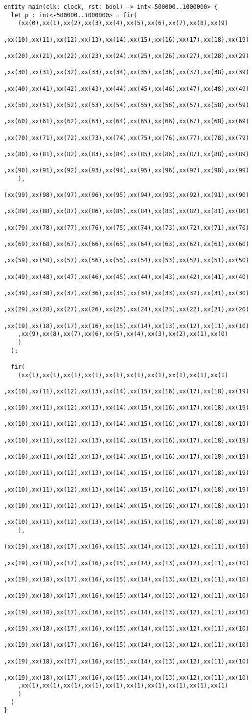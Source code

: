 \begin{verbatim}
entity main(clk: clock, rst: bool) -> int<-500000..1000000> {
  let p : int<-500000..1000000> = fir(
    (xx(0),xx(1),xx(2),xx(3),xx(4),xx(5),xx(6),xx(7),xx(8),xx(9)
    ,xx(10),xx(11),xx(12),xx(13),xx(14),xx(15),xx(16),xx(17),xx(18),xx(19)
    ,xx(20),xx(21),xx(22),xx(23),xx(24),xx(25),xx(26),xx(27),xx(28),xx(29)
    ,xx(30),xx(31),xx(32),xx(33),xx(34),xx(35),xx(36),xx(37),xx(38),xx(39)
    ,xx(40),xx(41),xx(42),xx(43),xx(44),xx(45),xx(46),xx(47),xx(48),xx(49)
    ,xx(50),xx(51),xx(52),xx(53),xx(54),xx(55),xx(56),xx(57),xx(58),xx(59)
    ,xx(60),xx(61),xx(62),xx(63),xx(64),xx(65),xx(66),xx(67),xx(68),xx(69)
    ,xx(70),xx(71),xx(72),xx(73),xx(74),xx(75),xx(76),xx(77),xx(78),xx(79)
    ,xx(80),xx(81),xx(82),xx(83),xx(84),xx(85),xx(86),xx(87),xx(88),xx(89)
    ,xx(90),xx(91),xx(92),xx(93),xx(94),xx(95),xx(96),xx(97),xx(98),xx(99)
    ),
    (xx(99),xx(98),xx(97),xx(96),xx(95),xx(94),xx(93),xx(92),xx(91),xx(90)
    ,xx(89),xx(88),xx(87),xx(86),xx(85),xx(84),xx(83),xx(82),xx(81),xx(80)
    ,xx(79),xx(78),xx(77),xx(76),xx(75),xx(74),xx(73),xx(72),xx(71),xx(70)
    ,xx(69),xx(68),xx(67),xx(66),xx(65),xx(64),xx(63),xx(62),xx(61),xx(60)
    ,xx(59),xx(58),xx(57),xx(56),xx(55),xx(54),xx(53),xx(52),xx(51),xx(50)
    ,xx(49),xx(48),xx(47),xx(46),xx(45),xx(44),xx(43),xx(42),xx(41),xx(40)
    ,xx(39),xx(38),xx(37),xx(36),xx(35),xx(34),xx(33),xx(32),xx(31),xx(30)
    ,xx(29),xx(28),xx(27),xx(26),xx(25),xx(24),xx(23),xx(22),xx(21),xx(20)
    ,xx(19),xx(18),xx(17),xx(16),xx(15),xx(14),xx(13),xx(12),xx(11),xx(10)
    ,xx(9),xx(8),xx(7),xx(6),xx(5),xx(4),xx(3),xx(2),xx(1),xx(0)
    )
  );

  fir(
    (xx(1),xx(1),xx(1),xx(1),xx(1),xx(1),xx(1),xx(1),xx(1),xx(1)
    ,xx(10),xx(11),xx(12),xx(13),xx(14),xx(15),xx(16),xx(17),xx(18),xx(19)
    ,xx(10),xx(11),xx(12),xx(13),xx(14),xx(15),xx(16),xx(17),xx(18),xx(19)
    ,xx(10),xx(11),xx(12),xx(13),xx(14),xx(15),xx(16),xx(17),xx(18),xx(19)
    ,xx(10),xx(11),xx(12),xx(13),xx(14),xx(15),xx(16),xx(17),xx(18),xx(19)
    ,xx(10),xx(11),xx(12),xx(13),xx(14),xx(15),xx(16),xx(17),xx(18),xx(19)
    ,xx(10),xx(11),xx(12),xx(13),xx(14),xx(15),xx(16),xx(17),xx(18),xx(19)
    ,xx(10),xx(11),xx(12),xx(13),xx(14),xx(15),xx(16),xx(17),xx(18),xx(19)
    ,xx(10),xx(11),xx(12),xx(13),xx(14),xx(15),xx(16),xx(17),xx(18),xx(19)
    ,xx(10),xx(11),xx(12),xx(13),xx(14),xx(15),xx(16),xx(17),xx(18),xx(19)
    ),
    (xx(19),xx(18),xx(17),xx(16),xx(15),xx(14),xx(13),xx(12),xx(11),xx(10)
    ,xx(19),xx(18),xx(17),xx(16),xx(15),xx(14),xx(13),xx(12),xx(11),xx(10)
    ,xx(19),xx(18),xx(17),xx(16),xx(15),xx(14),xx(13),xx(12),xx(11),xx(10)
    ,xx(19),xx(18),xx(17),xx(16),xx(15),xx(14),xx(13),xx(12),xx(11),xx(10)
    ,xx(19),xx(18),xx(17),xx(16),xx(15),xx(14),xx(13),xx(12),xx(11),xx(10)
    ,xx(19),xx(18),xx(17),xx(16),xx(15),xx(14),xx(13),xx(12),xx(11),xx(10)
    ,xx(19),xx(18),xx(17),xx(16),xx(15),xx(14),xx(13),xx(12),xx(11),xx(10)
    ,xx(19),xx(18),xx(17),xx(16),xx(15),xx(14),xx(13),xx(12),xx(11),xx(10)
    ,xx(19),xx(18),xx(17),xx(16),xx(15),xx(14),xx(13),xx(12),xx(11),xx(10)
    ,xx(1),xx(1),xx(1),xx(1),xx(1),xx(1),xx(1),xx(1),xx(1),xx(1)
    )
  )
}
\end{verbatim}
